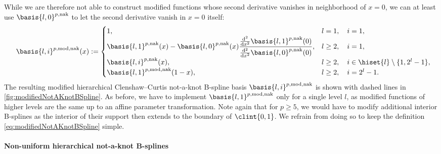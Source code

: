 While we are therefore not able to construct modified functions
whose second derivative vanishes in neighborhood of $x = 0$,
we can at least use $\basis{l,0}^{p,\notaknot}$ to let the
second derivative vanish in $x = 0$ itself:
\begin{equation}
  \label{eq:modifiedNotAKnotBSpline}
  \basis{l,i}^{p,\modified,\notaknot}(x)
  :=
  \begin{cases}
    1,&
    l = 1,\quad i = 1,\\
    \basis{l,1}^{p,\notaknot}(x)
    - \basis{l,0}^{p,\notaknot}(x)
    \dfrac{\frac{\diff^2}{\dx^2} \basis{l,1}^{p,\notaknot}(0)}%
    {\frac{\diff^2}{\dx^2} \basis{l,0}^{p,\notaknot}(0)},&
    l \ge 2,\quad i = 1,\\
    \basis{l,i}^{p,\notaknot}(x),&
    l \ge 2,\quad i \in \hiset{l} \setminus \{1, 2^l - 1\},\\
    \basis{l,1}^{p,\modified,\notaknot}(1 - x),&
    l \ge 2,\quad i = 2^l - 1.
  \end{cases}
  \hspace*{-2mm}
\end{equation}
The resulting modified hierarchical Clenshaw--Curtis not-a-knot B-spline basis
$\basis{l,i}^{p,\modified,\notaknot}$ is shown with dashed lines
in \cref{fig:modifiedNotAKnotBSpline}.
As before, we have to implement $\basis{l,1}^{p,\modified,\notaknot}$
only for a single level $l$, as modified functions of higher levels
are the same up to an affine parameter transformation.
Note again that for $p \ge 5$, we would have to modify additional
interior B-splines as the interior of their support then extends to the
boundary of $\clint{0, 1}$.
We refrain from doing so to keep the definition
\eqref{eq:modifiedNotAKnotBSpline} simple.

\paragraph{Non-uniform hierarchical not-a-knot B-splines}


